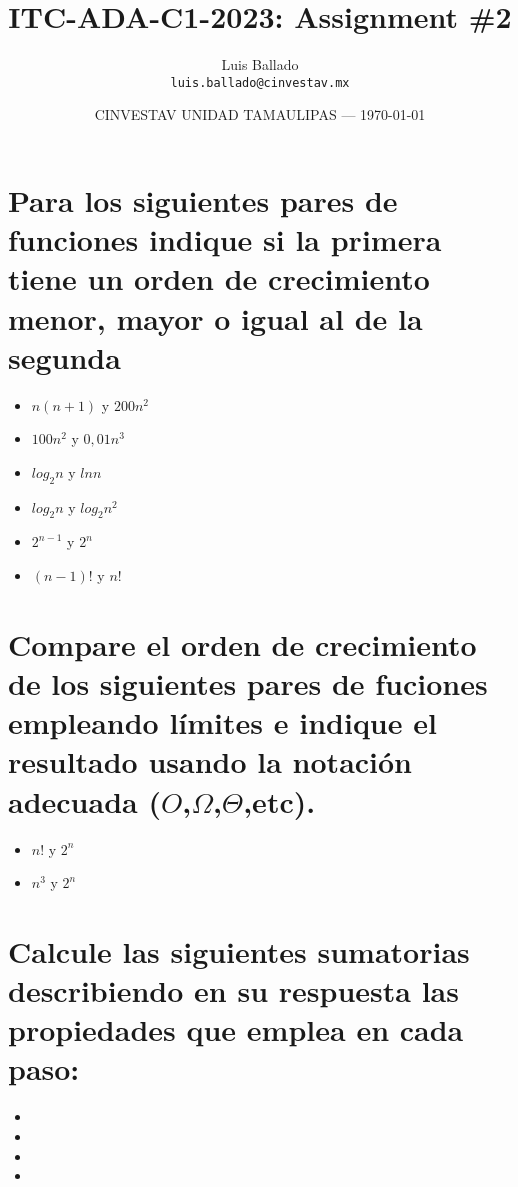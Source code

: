 \documentclass{article}
\title{ITC-ADA-C1-2023: Assignment \#2} %
\author{Luis Ballado\\ \texttt{luis.ballado@cinvestav.mx}} %
\date{CINVESTAV UNIDAD TAMAULIPAS --- \today} %
\begin{document}
\maketitle %


\section{Para los siguientes pares de funciones indique si la primera tiene un orden de crecimiento menor, mayor o igual al de la segunda}

\begin{itemize}
\item $n(n+1)$ y $200n^{2}$
\item $100n^{2}$ y $0,01n^{3}$
\item $log_{2}n$ y $ln n$
\item $log_{2} n$ y $log_{2}n^{2}$
\item $2^{n-1}$ y $2^{n}$
\item $(n-1)!$ y $n!$
\end{itemize}

\newpage
\section{Compare el orden de crecimiento de los siguientes pares de fuciones empleando límites e indique el resultado usando la notación adecuada ($O$,$\Omega$,$\Theta$,etc).}

\begin{itemize}
\item $n!$ y $2^{n}$
\item $n^{3}$ y $2^{n}$
\end{itemize}

\newpage
\section{Calcule las siguientes sumatorias describiendo en su respuesta las propiedades que emplea en cada paso:}

\begin{itemize}
\item 
\item
\item 
\item 
\end{itemize}
\end{document}
